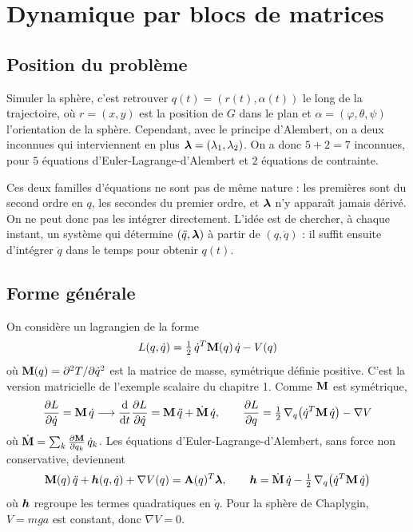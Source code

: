 
\section{Dynamique par blocs de matrices}

\subsection{Position du problème}

Simuler la sphère, c'est retrouver $q(t) = (r(t),\alpha(t))$ le long de
la trajectoire, où $r = (x,y)$ est la position de $G$ dans le plan et
$\alpha = (\varphi,\theta,\psi)$ l'orientation de la sphère. Cependant, avec le principe d'Alembert, on a deux inconnues qui interviennent en plus
$\bm{\lambda} = (\lambda_1,\lambda_2)$. On a donc
$5 + 2 = 7$ inconnues, pour $5$ équations
d'Euler-Lagrange-d'Alembert et $2$ équations de contrainte.

Ces deux familles d'équations ne sont pas de même nature : les
premières sont du second ordre en $q$, les secondes du premier ordre,
et $\bm{\lambda}$ n'y apparaît jamais dérivé. On ne peut donc pas les
intégrer directement. L'idée est de chercher, à chaque instant, un
système qui détermine $(\ddot q,\bm{\lambda})$ à partir de
$(q,\dot q)$ : il suffit ensuite d'intégrer $\ddot q$ dans le temps
pour obtenir $q(t)$.

\subsection{Forme générale}

On considère un lagrangien de la forme
\[
    L(q,\dot q) = \tfrac12\,\dot q^T\mathbf{M}(q)\,\dot q - V(q)
\]
où $\mathbf{M}(q) = \partial^2 T/\partial\dot q^2$ est la matrice de
masse, symétrique définie positive. C'est la version matricielle de
l'exemple scalaire du chapitre 1. Comme $\mathbf{M}$ est symétrique,
\[
    \frac{\partial L}{\partial \dot q} = \mathbf{M}\,\dot q
    \longrightarrow
    \frac{\mathrm{d}}{\mathrm{d} t}\frac{\partial L}{\partial \dot q} = \mathbf{M}\,\ddot q + \dot{\mathbf{M}}\,\dot q,
    \qquad
    \frac{\partial L}{\partial q} = \tfrac12\,\nabla_q\bigl(\dot q^T\mathbf{M}\,\dot q\bigr)
    - \nabla V
\]
où $\dot{\mathbf{M}} = \sum_k \frac{\partial \mathbf{M}}{\partial q_k}\,\dot q_k$. Les équations
d'Euler-Lagrange-d'Alembert, sans force non conservative, deviennent
\[
    \mathbf{M}(q)\,\ddot q + \bm{h}(q,\dot q) + \nabla V(q)
    = \mathbf{A}(q)^T\bm{\lambda},
    \qquad
    \bm{h} = \dot{\mathbf{M}}\,\dot q
    - \tfrac12\,\nabla_q\bigl(\dot q^T\mathbf{M}\,\dot q\bigr)
\]
où $\bm{h}$ regroupe les termes quadratiques en $\dot q$. Pour la
sphère de Chaplygin, $V = m g a$ est constant, donc $\nabla V = 0$.

